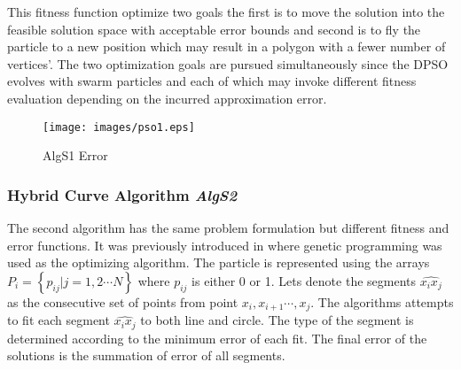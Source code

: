 This fitness function optimize two goals the first is to move the solution into the feasible solution space with acceptable error bounds and second is to fly the particle to a new position which may result in a polygon with a fewer number of vertices'\cite{PolygonApproximationPSO}.  The two optimization goals are pursued simultaneously since the DPSO evolves with swarm particles and each of which may invoke different fitness evaluation depending on the incurred approximation error. 
\begin{figure}
	\centering
  \texttt{[image: images/pso1.eps]}			
	\caption{AlgS1 Error}%
	\label{fig:DPSOERROR}
\end{figure}
\subsubsection{Hybrid Curve Algorithm \textsl{AlgS2}}
\label{sec:PolygonDivisionAlgorithm}

The second algorithm has the same problem formulation but different fitness and error functions. It was previously introduced in  \cite{CruveDivisionSwarm} where genetic programming was used as the optimizing algorithm. The particle is represented using the arrays $P_i = \left\{ {p_{ij} \left| {j = 1,2 \cdots N} \right.} \right\}$ where $p_{ij}$ is either 0 or 1. Lets denote the segments $\widehat{x_ix_j}$ as the consecutive set of points from point $x_i,x_{i+1} \cdots,x_j$. The algorithms attempts to fit each segment $\widehat{x_ix_j}$ to both line and circle. The type of the segment is determined according to the minimum error of each fit. The final error of the solutions is the summation of error of all segments.  %
